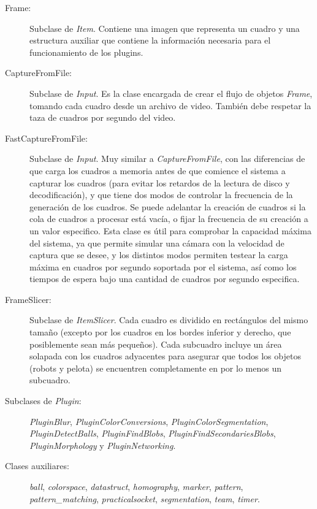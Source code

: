 \begin{description}

	\item[Frame:] Subclase de \emph{Item}. Contiene una imagen que
		representa un cuadro y una estructura auxiliar que contiene la
		información necesaria para el funcionamiento de los plugins.

	\item[CaptureFromFile:] Subclase de \emph{Input}. Es la clase encargada
		de crear el flujo de objetos \emph{Frame}, tomando cada cuadro
		desde un archivo de video. También debe respetar la taza de
		cuadros por segundo del video.

	\item[FastCaptureFromFile:] Subclase de \emph{Input}. Muy similar a
		\emph{CaptureFromFile}, con las diferencias de que carga los
		cuadros a memoria antes de que comience el sistema a capturar
		los cuadros (para evitar los retardos de la lectura de disco y
		decodificación), y que tiene dos modos de controlar la
		frecuencia de la generación de los cuadros. Se puede adelantar
		la creación de cuadros si la cola de cuadros a procesar está
		vacía, o fijar la frecuencia de su creación a un valor
		especifico. Esta clase es útil para comprobar la capacidad
		máxima del sistema, ya que permite simular una cámara con la
		velocidad de captura que se desee, y los distintos modos
		permiten testear la carga máxima en cuadros por segundo
		soportada por el sistema, así como los tiempos de espera bajo
		una cantidad de cuadros por segundo especifica.

	\item[FrameSlicer:] Subclase de \emph{ItemSlicer}. Cada cuadro es
		dividido en rectángulos del mismo tamaño (excepto por los
		cuadros en los bordes inferior y derecho, que posiblemente sean
		más pequeños). Cada subcuadro incluye un área solapada con los
		cuadros adyacentes para asegurar que todos los objetos (robots y
		pelota) se encuentren completamente en por lo menos un
		subcuadro.

	\item[Subclases de \emph{Plugin}:] \emph{PluginBlur},
		\emph{PluginColorConversions}, \emph{PluginColorSegmentation},
		\emph{PluginDetectBalls}, \emph{PluginFindBlobs},
		\emph{PluginFindSecondariesBlobs}, \emph{PluginMorphology} y
		\emph{PluginNetworking}.

	\item[Clases auxiliares:] \emph{ball}, \emph{colorspace},
		\emph{datastruct}, \emph{homography}, \emph{marker},
		\emph{pattern}, \emph{pattern\_matching},
		\emph{practicalsocket}, \emph{segmentation}, \emph{team},
		\emph{timer}.

\end{description}

